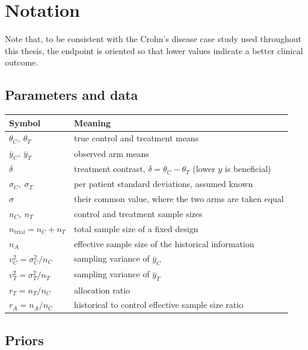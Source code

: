 \chapter*{Notation}
\label{c:Notation}

Note that, to be consistent with the Crohn's disease case 
study used throughout this thesis, the endpoint is oriented 
so that lower values indicate a better clinical outcome.


\section*{Parameters and data}

\begin{tabularx}{\linewidth}{@{}lX@{}}
\toprule
Symbol & Meaning \\
\midrule
$\theta_C,\ \theta_T$        & true control and treatment means \\
$\bar y_C,\ \bar y_T$        & observed arm means \\
$\delta$                     & treatment contrast, $\delta = \theta_C - \theta_T$ (lower $y$ is beneficial) \\
$\sigma_C,\ \sigma_T$        & per patient standard deviations, assumed known \\
$\sigma$                     & their common value, where the two arms are taken equal \\
$n_C,\ n_T$                  & control and treatment sample sizes \\
$n_{\text{trial}} = n_C + n_T$ & total sample size of a fixed design \\
$n_A$                        & effective sample size of the historical information \\
$v_C^2 = \sigma_C^2/n_C$       & sampling variance of $\bar y_C$ \\
$v_T^2 = \sigma_T^2/n_T$       & sampling variance of $\bar y_T$ \\
$r_T = n_T/n_C$              & allocation ratio \\
$r_A = n_A/n_C$              & historical to control effective sample size ratio \\
\bottomrule
\end{tabularx}

\section*{Priors}

